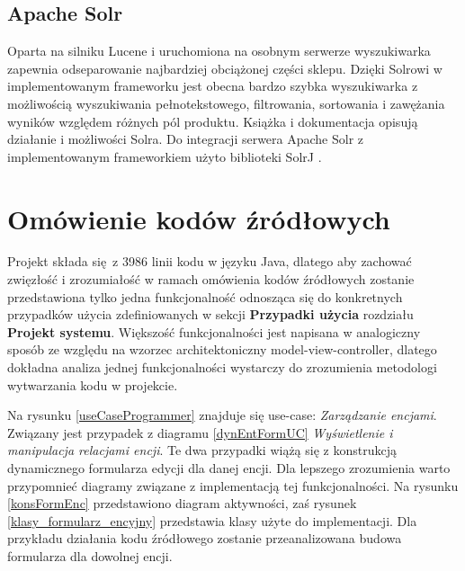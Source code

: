 \subsection{Apache Solr} 
Oparta na silniku Lucene i uruchomiona na osobnym serwerze wyszukiwarka zapewnia odseparowanie najbardziej obciążonej części sklepu. Dzięki Solrowi w implementowanym frameworku jest obecna bardzo szybka wyszukiwarka z możliwością wyszukiwania pełnotekstowego, filtrowania, sortowania i zawężania wyników względem różnych pól produktu. Książka \cite{solrbook} i dokumentacja \cite{Solr-doc} opisują działanie i możliwości Solra. Do integracji serwera Apache Solr z implementowanym frameworkiem użyto biblioteki SolrJ \cite{solrJ}.

\section{Omówienie kodów źródłowych}
Projekt składa się z 3986 linii kodu w języku Java, dlatego aby zachować zwięzłość i zrozumiałość w ramach omówienia kodów źródłowych zostanie przedstawiona tylko jedna funkcjonalność odnosząca się do konkretnych przypadków użycia zdefiniowanych w sekcji \textbf{Przypadki użycia} rozdziału \textbf{Projekt systemu}. Większość funkcjonalności jest napisana w analogiczny sposób ze względu na wzorzec architektoniczny model-view-controller, dlatego dokładna analiza jednej funkcjonalności wystarczy do zrozumienia metodologi wytwarzania kodu w projekcie. 

Na rysunku \ref{useCaseProgrammer} znajduje się use-case: \textit{Zarządzanie encjami}. Związany jest przypadek z diagramu \ref{dynEntFormUC} \textit{Wyświetlenie i manipulacja relacjami encji}.  Te dwa przypadki wiążą się z konstrukcją dynamicznego formularza edycji dla danej encji. Dla lepszego zrozumienia warto przypomnieć diagramy związane z implementacją tej funkcjonalności. Na rysunku \ref{konsFormEnc} przedstawiono diagram aktywności, zaś rysunek \ref{klasy_formularz_encyjny} przedstawia klasy użyte do implementacji. Dla przykładu działania kodu źródłowego zostanie przeanalizowana budowa formularza dla dowolnej encji.

